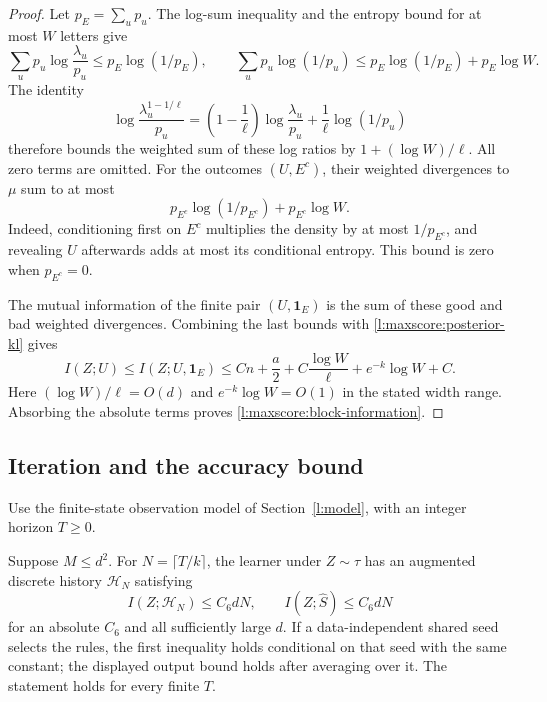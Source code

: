 \begin{proof}
Let \(p_E=\sum_up_u\).  The log-sum inequality and the entropy
bound for at most \(W\) letters give
\[
 \sum_up_u\log\frac{\lambda_u}{p_u}\le p_E\log(1/p_E),
 \qquad
 \sum_up_u\log(1/p_u)\le p_E\log(1/p_E)+p_E\log W.
\]
The identity
\[
 \log\frac{\lambda_u^{1-1/\ell}}{p_u}
 =\left(1-\frac1\ell\right)\log\frac{\lambda_u}{p_u}
       +\frac1\ell\log(1/p_u)
\]
therefore bounds the weighted sum of these log ratios by
\(1+(\log W)/\ell\).  All zero terms are omitted.
For the outcomes \((U,E^c)\), their weighted divergences to \(\mu\)
sum to at most
\[
 p_{E^c}\log(1/p_{E^c})+p_{E^c}\log W.
\]
Indeed, conditioning first on \(E^c\) multiplies the density by
at most \(1/p_{E^c}\), and revealing \(U\) afterwards adds at
most its conditional entropy.  This bound is zero when \(p_{E^c}=0\).

The mutual information of the finite pair \((U,\mathbf1_E)\) is
the sum of these good and bad weighted divergences.  Combining the
last bounds with \eqref{l:maxscore:posterior-kl} gives
\[
 I(Z;U)\le I(Z;U,\mathbf1_E)
 \le Cn+\frac a2+C\frac{\log W}{\ell}
          +e^{-k}\log W+C.
\]
Here \((\log W)/\ell=O(d)\) and
\(e^{-k}\log W=O(1)\) in the stated width range.  Absorbing the
absolute terms proves \eqref{l:maxscore:block-information}.
\end{proof}

\subsection{Iteration and the accuracy bound}

Use the finite-state observation model of Section~\ref{l:model}, with
an integer horizon \(T\ge0\).

\begin{proposition}
\label{l:maxscore:iteration}
Suppose \(M\le d^2\).  For \(N=\lceil T/k\rceil\), the learner
under \(Z\sim\tau\) has an augmented discrete history
\(\mathcal H_N\) satisfying
\begin{equation}\label{l:maxscore:total-information}
 I(Z;\mathcal H_N)\le C_6dN,\qquad
 I(Z;\widehat S)\le C_6dN
\end{equation}
for an absolute \(C_6\) and all sufficiently large \(d\).
If a data-independent shared seed selects the rules, the first
inequality holds conditional on that seed with the same constant;
the displayed output bound holds after averaging over it.
The statement holds for every finite \(T\).
\end{proposition}

